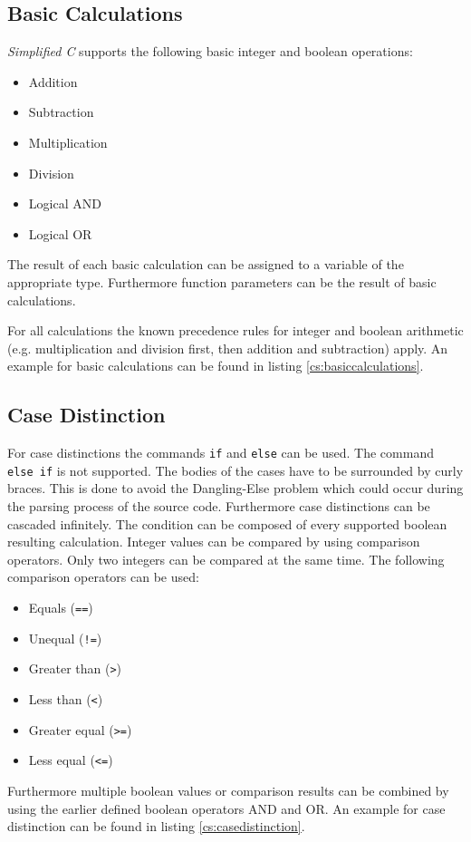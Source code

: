 \documentclass[12pt,a4paper,titlepage,oneside,final]{article}
\begin{document}
\subsection{Basic Calculations}
\emph{Simplified C} supports the following basic integer and boolean operations:

\begin{itemize}
\item Addition
\item Subtraction
\item Multiplication
\item Division
\item Logical AND
\item Logical OR
\end{itemize}
The result of each basic calculation can be assigned to a variable of the appropriate type. Furthermore function parameters can be the result of basic calculations.

For all calculations the known precedence rules for integer and boolean arithmetic (e.g. multiplication and division first, then addition and subtraction) apply. An example for basic calculations can be found in listing \vref{cs:basiccalculations}.



\subsection{Case Distinction}
\label{subsec:casedistinction}
For case distinctions the commands \texttt{if} and \texttt{else} can be used. The command \texttt{else if} is not supported. The bodies of the cases have to be surrounded by curly braces. This is done to avoid the Dangling-Else problem which could occur during the parsing process of the source code. Furthermore case distinctions can be cascaded infinitely. The condition can be composed of every supported boolean resulting calculation. Integer values can be compared by using comparison operators. Only two integers can be compared at the same time. The following comparison operators can be used:

\begin{itemize}
\item Equals (\texttt{==})
\item Unequal (\texttt{!=})
\item Greater than (\texttt{>})
\item Less than (\texttt{<})
\item Greater equal (\texttt{>=})
\item Less equal (\texttt{<=})
\end{itemize}
Furthermore multiple boolean values or comparison results can be combined by using the earlier defined boolean operators AND and OR. An example for case distinction can be found in listing \vref{cs:casedistinction}.
\end{document}

